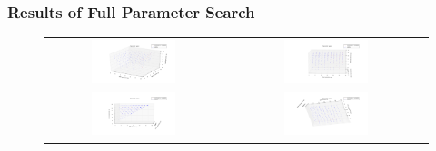 \documentclass{beamer}
\begin{document}
{
  \frametitle{Results of Full Parameter Search}
  \begin{figure}[H]
  \centering
        \begin{tabular}{@{}cc@{}cc@{}}
		\includegraphics[width = 0.5\textwidth]{./pics/Eco_All_param_front.png} &&
                \includegraphics[width = 0.5\textwidth]{./pics/Eco_All_param_rep_v_rep.png} \\
                \includegraphics[width = 0.5\textwidth]{./pics/Eco_All_param_wage_v_wstarve.png} &&
                \includegraphics[width = 0.5\textwidth]{./pics/Eco_All_param_wstarve_v_drep.png} \\
        \end{tabular}
        \label{RestrictParam}
  \end{figure}

}
\end{document}
